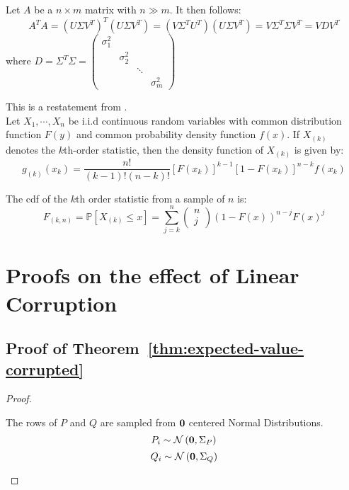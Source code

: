 \documentclass{article} %
\begin{document}
\begin{appendices}
	\begin{fact}
		Let $A$ be a $n \times m$ matrix with $n \gg m$. It then follows:
		\begin{equation}
			A^T A = \left(U \Sigma V^T\right)^T \left(U \Sigma V^T \right) = \left(V\Sigma^T U^T\right)\left(U \Sigma V^T\right) = V \Sigma^T \Sigma V^T = V D V^T
		\end{equation}
		where $D = \Sigma^T \Sigma = \begin{pmatrix} \sigma_1^2 & & & \\ & \sigma_2^2 & & \\ & & \ddots & \\ & & & \sigma_m^2 \end{pmatrix}$
	\end{fact}

	\begin{fact}
		This is a restatement from \cite{Wackerly2008}.\\
		Let $X_1,\cdots, X_n$ be i.i.d continuous random variables with common distribution function $F(y)$ and common probability density function $f(x)$. If $X_{(k)}$ denotes the $k$th-order statistic, then the density function of $X_{(k)}$ is given by:
		\begin{equation}
			g_{(k)}(x_k) = \frac{n!}{(k-1)!(n-k)!}[F(x_k)]^{k-1}[1 - F(x_k)]^{n-k}f(x_k)
		\end{equation}
	\end{fact}

	\begin{fact}
		The cdf of the $k$th order statistic from a sample of $n$ is:
		\begin{equation}
			F_{(k,n)} = \mathbb{P}\left[X_{(k)}\leq x \right] = \sum_{j=k}^n \begin{pmatrix} n \\ j\end{pmatrix} \left(1 - F(x)\right)^{n-j} F(x)^j
		\end{equation}
	\end{fact}

	\newpage
	
	\section{Proofs on the effect of Linear Corruption}\label{app:sub-quantile-optimization}
	\subsection{Proof of Theorem~\ref{thm:expected-value-corrupted}}\label{app:expected-value-corrupted}
	\begin{proof}
	\begin{assumption}\label{asm:normal-sampling}
		The rows of $P$ and $Q$ are sampled from ${\bm{0}}$ centered Normal Distributions.
		\begin{equation*}
			P_i \sim \mathcal{N}\left({\bm{0}}, \Sigma_P\right)
		\end{equation*}
		\begin{equation}
			Q_i \sim \mathcal{N}\left({\bm{0}}, \Sigma_Q\right)
		\end{equation}
	\end{assumption}
	

\end{proof}
\end{appendices}
\end{document}
